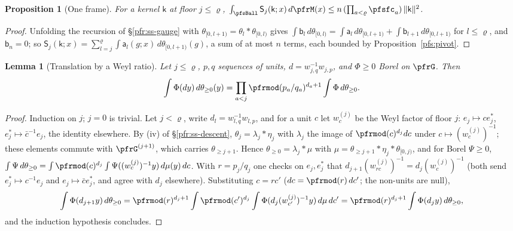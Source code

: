 \documentclass[10pt]{amsart}
\newtheorem{proposition}[theorem]{Proposition}
\newtheorem{lemma}[theorem]{Lemma}
\theoremstyle{definition}
\theoremstyle{remark}
\begin{document}
\begin{proposition}[One frame]\label{pfs:frame}
For a kernel $\mathsf k$ at floor $j\le\varrho$,
$\int_{\pfsBall}\mathsf S_j(\mathsf k;x)\,d\pfrM(x)\le n\,(\prod_{a<\varrho}\pfsfc_a)\,\|\mathsf k\|^2$.
\end{proposition}
\begin{proof}
Unfolding the recursion of \S\ref{pfr:ss-gauge} with $\theta_{[0,l+1)}=\theta_l*\theta_{[0,l)}$ gives $\int\mathsf b_l\,d\theta_{[0,l)}=
\int\mathsf a_l\,d\theta_{[0,l+1)}+\int\mathsf b_{l+1}\,d\theta_{[0,l+1)}$ for $l\le\varrho$, and $\mathsf b_n=0$; so
$\mathsf S_j(\mathsf k;x)=\sum_{l=j}^{\varrho}\int\mathsf a_l(g;x)\,d\theta_{[0,l+1)}(g)$, a sum of at most $n$ terms, each bounded
by Proposition~\ref{pfs:pivot}.
\end{proof}

\begin{lemma}[Translation by a Weyl ratio]\label{pfs:weylratio}
Let $j\le\varrho$, $p,q$ sequences of units, $d=w_{j,q}^{-1}w_{j,p}$, and $\Phi\ge0$ Borel on $\pfrG$. Then
\[
\int\Phi(dy)\,d\theta_{\ge0}(y)=\prod_{a<j}\pfrmod(p_a/q_a)^{d_a+1}\int\Phi\,d\theta_{\ge0}.
\]
\end{lemma}
\begin{proof}
Induction on $j$; $j=0$ is trivial. Let $j<\varrho$, write $d_l=w_{l,q}^{-1}w_{l,p}$, and for a unit $c$ let $w^{(j)}_c$ be the
Weyl factor of floor $j$: $e_j\mapsto ce_j^*$, $e_j^*\mapsto\bar c^{-1}e_j$, the identity elsewhere. By (iv) of
\S\ref{pfr:ss-descent}, $\theta_j=\lambda_j*\eta_j$ with $\lambda_j$ the image of $\pfrmod(c)^{d_j}dc$ under $c\mapsto(w^{(j)}_c)^{-1}$;
these elements commute with $\pfrG^{(j+1)}$, which carries $\theta_{\ge j+1}$. Hence $\theta_{\ge0}=\lambda_j*\mu$ with
$\mu=\theta_{\ge j+1}*\eta_j*\theta_{[0,j)}$, and for Borel $\Psi\ge0$,
$\int\Psi\,d\theta_{\ge0}=\int\pfrmod(c)^{d_j}\int\Psi((w^{(j)}_c)^{-1}y)\,d\mu(y)\,dc$. With $r=p_j/q_j$ one checks on $e_j,e_j^*$
that $d_{j+1}(w^{(j)}_{rc})^{-1}=d_j(w^{(j)}_c)^{-1}$ (both send $e_j^*\mapsto c^{-1}e_j$ and $e_j\mapsto\bar ce_j^*$, and agree with
$d_j$ elsewhere). Substituting $c=rc'$ ($dc=\pfrmod(r)\,dc'$; the non-units are null),
\[
\int\Phi(d_{j+1}y)\,d\theta_{\ge0}=\pfrmod(r)^{d_j+1}\int\pfrmod(c')^{d_j}\int\Phi(d_j(w^{(j)}_{c'})^{-1}y)\,d\mu\,dc'=
\pfrmod(r)^{d_j+1}\int\Phi(d_jy)\,d\theta_{\ge0},
\]
and the induction hypothesis concludes.
\end{proof}
\end{document}
